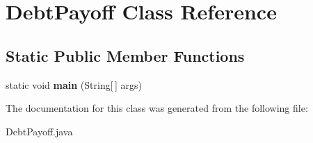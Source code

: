 \hypertarget{class_debt_payoff}{}\section{Debt\+Payoff Class Reference}
\label{class_debt_payoff}
\subsection*{Static Public Member Functions}
\begin{DoxyCompactItemize}
\item 
\mbox{\label{class_debt_payoff_aeb53ae6a1c2cf1e5ce7ba95e5bca1812}} 
static void {\bfseries main} (String\mbox{[}$\,$\mbox{]} args)
\end{DoxyCompactItemize}


The documentation for this class was generated from the following file\+:\begin{DoxyCompactItemize}
\item 
Debt\+Payoff.\+java\end{DoxyCompactItemize}
